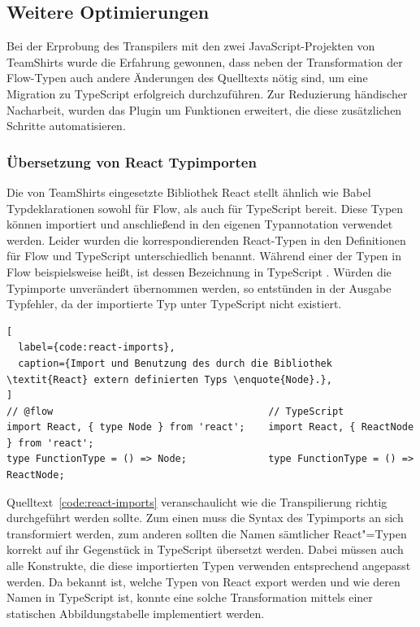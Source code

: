 \tablespace


\subsection{Weitere Optimierungen}
\label{sec:optimizations}

Bei der Erprobung des Transpilers mit den zwei JavaScript-Projekten von TeamShirts wurde die Erfahrung gewonnen, dass neben der Transformation der Flow-Typen auch andere Änderungen des Quelltexts nötig sind, um eine Migration zu TypeScript erfolgreich durchzuführen. Zur Reduzierung händischer Nacharbeit, wurden das Plugin um Funktionen erweitert, die diese zusätzlichen Schritte automatisieren.

\subsubsection{Übersetzung von React Typimporten}
\label{sec:react-type-import-mapping}

Die von TeamShirts eingesetzte Bibliothek React stellt ähnlich wie Babel Typdeklarationen sowohl für Flow, als auch für TypeScript bereit. Diese Typen können importiert und anschließend in den eigenen Typannotation verwendet werden. Leider wurden die korrespondierenden React-Typen in den Definitionen für Flow und TypeScript unterschiedlich benannt. Während einer der Typen in Flow beispielsweise  heißt, ist dessen Bezeichnung in TypeScript . Würden die Typimporte unverändert übernommen werden, so entstünden in der Ausgabe Typfehler, da der importierte Typ unter TypeScript nicht existiert.

\begin{lstlisting}[
  label={code:react-imports},
  caption={Import und Benutzung des durch die Bibliothek \textit{React} extern definierten Typs \enquote{Node}.},
]
// @flow                                     // TypeScript
import React, { type Node } from 'react';    import React, { ReactNode } from 'react';
type FunctionType = () => Node;              type FunctionType = () => ReactNode;
\end{lstlisting}

Quelltext~\ref{code:react-imports} veranschaulicht wie die Transpilierung richtig durchgeführt werden sollte. Zum einen muss die Syntax des Typimports an sich transformiert werden, zum anderen sollten die Namen sämtlicher React"=Typen korrekt auf ihr Gegenstück in TypeScript übersetzt werden. Dabei müssen auch alle Konstrukte, die diese importierten Typen verwenden entsprechend angepasst werden. Da bekannt ist, welche Typen von React export werden und wie deren Namen in TypeScript ist, konnte eine solche Transformation mittels einer statischen Abbildungstabelle implementiert werden.

